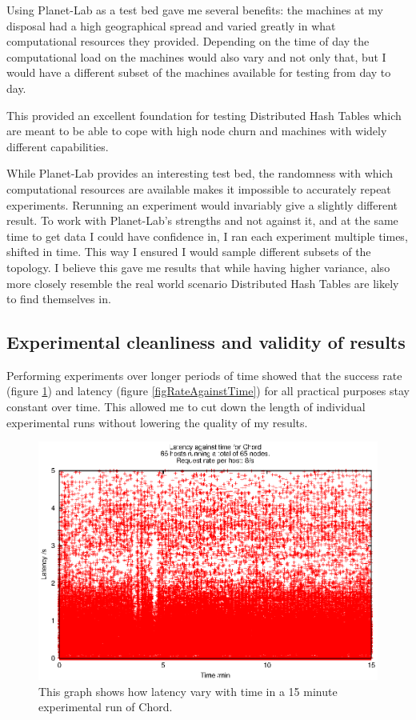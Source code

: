 Using Planet-Lab as a test bed gave me several benefits: the machines at my disposal had a high geographical spread and varied greatly in what computational resources they provided. Depending on the time of day the computational load on the machines would also vary and not only that, but I would have a different subset of the machines available for testing from day to day.

This provided an excellent foundation for testing Distributed Hash Tables which are meant to be able to cope with high node churn and machines with widely different capabilities.

While Planet-Lab provides an interesting test bed, the randomness with which computational resources are available makes it impossible to accurately repeat experiments. Rerunning an experiment would invariably give a slightly different result.
To work with Planet-Lab's strengths and not against it, and at the same time to get data I could have confidence in, I ran each experiment multiple times, shifted in time. This way I ensured I would sample different subsets of the topology. I believe this gave me results that while having higher variance, also more closely resemble the real world scenario Distributed Hash Tables are likely to find themselves in.

\subsection{Experimental cleanliness and validity of results}
Performing experiments over longer periods of time showed that the success rate (figure \ref{figLatencyAgainstTime}) and latency (figure \ref{figRateAgainstTime}) for all practical purposes stay constant over time. This allowed me to cut down the length of individual experimental runs without lowering the quality of my results.

\begin{figure}[!htb]
  \begin{center}
    \includegraphics[width=0.9\linewidth]{illustrations/latency_aginst_time_chord.eps}
    \caption{This graph shows how latency vary with time in a 15 minute experimental run of Chord.}
    \label{figLatencyAgainstTime}
  \end{center}
\end{figure}

